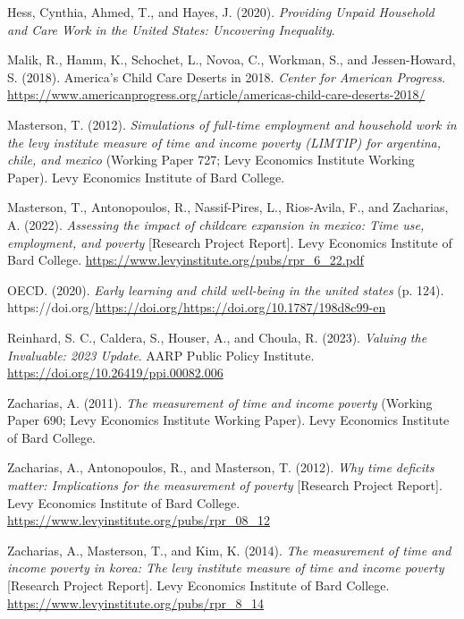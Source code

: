 \documentclass[
  11pt,
]{article}
\newlength{\cslhangindent}
\newenvironment{CSLReferences}[2] %
 {\begin{list}{}{%
  \setlength{\itemindent}{0pt}
  \setlength{\leftmargin}{0pt}
  \setlength{\parsep}{0pt}
  \ifodd #1
   \setlength{\leftmargin}{\cslhangindent}
   \setlength{\itemindent}{-1\cslhangindent}
  \fi
  \setlength{\itemsep}{#2\baselineskip}}}
 {\end{list}}
\begin{document}
\begin{CSLReferences}{1}{0}
Hess, Cynthia, Ahmed, T., and Hayes, J. (2020). \emph{Providing {Unpaid}
{Household} and {Care} {Work} in the {United} {States}: {Uncovering}
{Inequality}}.

Malik, R., Hamm, K., Schochet, L., Novoa, C., Workman, S., and
Jessen-Howard, S. (2018). America's {Child} {Care} {Deserts} in 2018.
\emph{Center for American Progress}.
\url{https://www.americanprogress.org/article/americas-child-care-deserts-2018/}

Masterson, T. (2012). \emph{Simulations of full-time employment and
household work in the levy institute measure of time and income poverty
(LIMTIP) for argentina, chile, and mexico} (Working Paper 727; Levy
Economics Institute Working Paper). Levy Economics Institute of Bard
College.

Masterson, T., Antonopoulos, R., Nassif-Pires, L., Rios-Avila, F., and
Zacharias, A. (2022). \emph{Assessing the impact of childcare expansion
in mexico: Time use, employment, and poverty} {[}Research Project
Report{]}. Levy Economics Institute of Bard College.
\url{https://www.levyinstitute.org/pubs/rpr_6_22.pdf}

OECD. (2020). \emph{Early learning and child well-being in the united
states} (p. 124).
https://doi.org/\url{https://doi.org/https://doi.org/10.1787/198d8c99-en}

Reinhard, S. C., Caldera, S., Houser, A., and Choula, R. (2023).
\emph{Valuing the {Invaluable}: 2023 {Update}}. AARP Public Policy
Institute. \url{https://doi.org/10.26419/ppi.00082.006}

Zacharias, A. (2011). \emph{The measurement of time and income poverty}
(Working Paper 690; Levy Economics Institute Working Paper). Levy
Economics Institute of Bard College.

Zacharias, A., Antonopoulos, R., and Masterson, T. (2012). \emph{Why
time deficits matter: Implications for the measurement of poverty}
{[}Research Project Report{]}. Levy Economics Institute of Bard College.
\url{https://www.levyinstitute.org/pubs/rpr_08_12}

Zacharias, A., Masterson, T., and Kim, K. (2014). \emph{The measurement
of time and income poverty in korea: The levy institute measure of time
and income poverty} {[}Research Project Report{]}. Levy Economics
Institute of Bard College.
\url{https://www.levyinstitute.org/pubs/rpr_8_14}


\end{CSLReferences}
\end{document}
